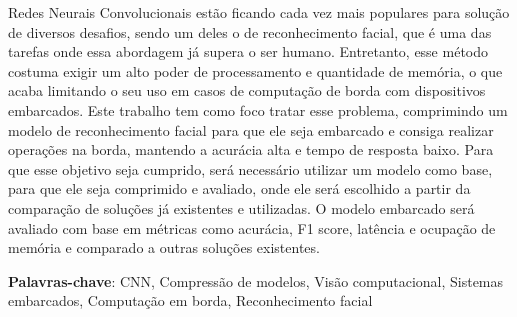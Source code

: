 \setlength{\absparsep}{18pt} %
\begin{resumo}

Redes Neurais Convolucionais estão ficando cada vez mais populares para solução de diversos desafios, sendo um deles
o de reconhecimento facial, que é uma das tarefas onde essa abordagem já supera o ser humano.
Entretanto, esse método costuma exigir um alto poder de processamento e quantidade de memória, o que acaba
limitando o seu uso em casos de computação de borda com dispositivos embarcados.
Este trabalho tem como foco tratar esse problema, comprimindo um modelo de reconhecimento facial para que ele seja
embarcado e consiga realizar operações na borda, mantendo a acurácia alta e tempo de resposta baixo.
Para que esse objetivo seja cumprido, será necessário utilizar um modelo como base, para que ele seja comprimido e
avaliado, onde ele será escolhido a partir da comparação de soluções já existentes e utilizadas.
O modelo embarcado será avaliado com base em métricas como acurácia, F1 score, latência e ocupação de memória e
comparado a outras soluções existentes.

 \textbf{Palavras-chave}: CNN, Compressão de modelos, Visão computacional, Sistemas embarcados, Computação em borda,
 Reconhecimento facial
\end{resumo}
